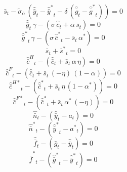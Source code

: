 \begin{dmath}
{{\bar s}}_{t}-{{\tilde\sigma_{\bar{\alpha}}}}\, \left({{\hat {\bar y}}}_{t}-{{\hat {\bar y}^*}}_{t}-{{\delta}}\, \left({{\hat {\bar g}}}_{t}-{{\hat {\bar g}^*}}_{t}\right)\right)=0
\end{dmath}
\begin{dmath}
{{\hat {\bar g}}}_{t}\, {{\gamma}}-\left({{\sigma}}\, {{\hat {\bar c}}}_{t}+{{\alpha}}\, {{\bar s}}_{t}\right)=0
\end{dmath}
\begin{dmath}
{{\hat {\bar g}^*}}_{t}\, {{\gamma}}-\left({{\sigma}}\, {{\hat {\bar c}^*}}_{t}-{{\bar s}}_{t}\, {{\alpha^*}}\right)=0
\end{dmath}
\begin{dmath}
{{\bar s}}_{t}+{{\bar s^*}}_{t}=0
\end{dmath}
\begin{dmath}
{{\hat {\bar c}^H}}_{t}-\left({{\hat {\bar c}}}_{t}+{{\bar s}}_{t}\, {{\alpha}}\, {{\eta}}\right)=0
\end{dmath}
\begin{dmath}
{{\hat {\bar c}^F}}_{t}-\left({{\hat {\bar c}}}_{t}+{{\bar s}}_{t}\, \left(-{{\eta}}\right)\, \left(1-{{\alpha}}\right)\right)=0
\end{dmath}
\begin{dmath}
{{\hat {\bar c}^{H*}}}_{t}-\left({{\hat {\bar c}^*}}_{t}+{{\bar s}}_{t}\, {{\eta}}\, \left(1-{{\alpha^*}}\right)\right)=0
\end{dmath}
\begin{dmath}
{{\hat {\bar c}^{F*}}}_{t}-\left({{\hat {\bar c}^*}}_{t}+{{\bar s}}_{t}\, {{\alpha^*}}\, \left(-{{\eta}}\right)\right)=0
\end{dmath}
\begin{dmath}
{{\hat {\bar n}}}_{t}-\left({{\hat {\bar y}}}_{t}-{{a}}_{t}\right)=0
\end{dmath}
\begin{dmath}
{{\hat {\bar n}^*}}_{t}-\left({{\hat {\bar y}^*}}_{t}-{{a^*}}_{t}\right)=0
\end{dmath}
\begin{dmath}
{{\hat {\bar f}}}_{t}-\left({{\hat {\bar g}}}_{t}-{{\hat {\bar y}}}_{t}\right)=0
\end{dmath}
\begin{dmath}
{{\hat {\bar f}^*}}_{t}-\left({{\hat {\bar g}^*}}_{t}-{{\hat {\bar y}^*}}_{t}\right)=0
\end{dmath}
